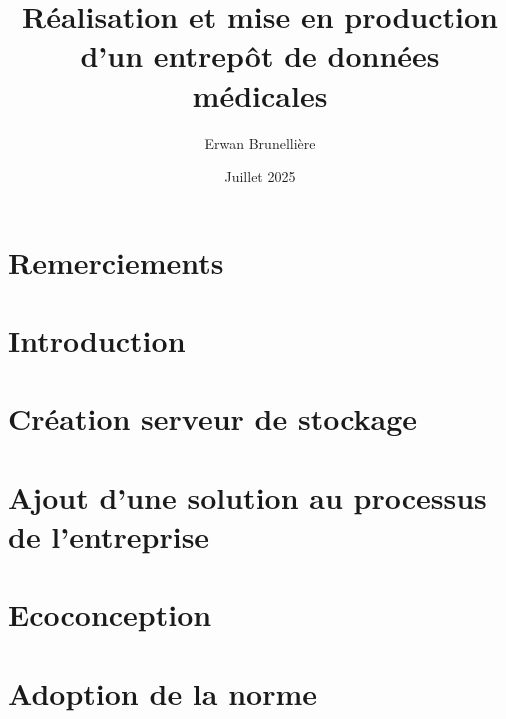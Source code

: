 \documentclass{memoireStyle}
\title{Réalisation et mise en production d'un entrepôt de données médicales}
\author{Erwan Brunellière}
\affil{IDIA 2025}
\affil{Polytech Nantes}
\date{Juillet 2025}
\begin{document}
\frontPage

\setStyle

\chapter*{Remerciements}

\chapter*{Introduction}

\tableofcontents

\chapter{Création serveur de stockage}

\chapter{Ajout d'une solution au processus de l'entreprise}

\chapter{Ecoconception}


\chapter{Adoption de la norme}



\end{document}
